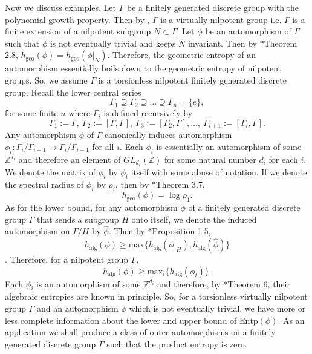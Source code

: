 \documentclass[a4paper,11pt,reqno]{amsart}
\theoremstyle{plain}
\theoremstyle{mainthmstyle}
\theoremstyle{named}
\numberwithin{equation}{section}
\begin{document}
     Now we discuss examples. Let $\Gamma$ be a finitely generated discrete group with the polynomial growth property. Then by \cite{Gromov}, $\Gamma$ is a virtually nilpotent group i.e. $\Gamma$ is a finite extension of a nilpotent subgroup $N\subset\Gamma$. Let $\phi$ be an automorphism of $\Gamma$ such that $\phi$ is not eventually trivial and keeps $N$ invariant. Then by \cite{MR4168745}*{Theorem 2.8}, $h_{\mathrm{geo}}(\phi)=h_{\mathrm{geo}}(\phi\vert_{N})$. Therefore, the geometric entropy of an automorphism essentially boils down to the geometric entropy of nilpotent groups. So, we assume $\Gamma$ is a torsionless nilpotent finitely generated discrete group. Recall the lower central series 
     \begin{displaymath}
         \Gamma_{1}\supseteq\Gamma_{2}\supseteq\ldots\supseteq\Gamma_{n}=\{e\},
     \end{displaymath}
    for some finite $n$ where $\Gamma_{i}$ is defined recursively by
    \begin{displaymath}
          \Gamma_{1}:=\Gamma, \ \Gamma_{2}:=[\Gamma,\Gamma], \ \Gamma_{3}:=[\Gamma_{2},\Gamma],\ldots, \ \Gamma_{i+1}:=[\Gamma_{i},\Gamma]. 
    \end{displaymath}
    Any automorphism $\phi$ of $\Gamma$ canonically induces automorphism $\phi_{i}:\Gamma_{i}/\Gamma_{i+1}\rightarrow\Gamma_{i}/\Gamma_{i+1}$ for all $i$. Each $\phi_{i}$ is essentially an automorphism of some $\mathbb{Z}^{d_{i}}$ and therefore an element of $GL_{d_{i}}(\mathbb{Z})$ for some natural number $d_{i}$ for each $i$. We denote the matrix of $\phi_{i}$ by $\phi_{i}$ itself with some abuse of notation. If we denote the spectral radius of $\phi_{i}$ by $\rho_{i}$, then by \cite{MR4168745}*{Theorem 3.7},
    \begin{equation} \label{abelianization}
        h_{\mathrm{geo}}(\phi)=\log\rho_1.
    \end{equation}
   As for the lower bound, for any automorphism $\phi$ of a finitely generated discrete group $\Gamma$ that sends a subgroup $H$ onto itself, we denote the induced automorphism on $\Gamma/H$ by $\hat {\phi}$. Then by \cite{MR0385834}*{Proposition 1.5}, 
\begin{equation} \label{algentlow} h_{\mathrm{alg}}(\phi)\geq\mathrm{max}\{h_{\mathrm{alg}}(\phi\vert_{H}),h_{\mathrm{alg}}(\hat {\phi})\} \end{equation}.
\hspace{-4.5mm} Therefore, for a nilpotent group $\Gamma$, \begin{displaymath}h_{\mathrm{alg}}(\phi)\geq\mathrm{max}_{i}\{h_{\mathrm{alg}}(\phi_{i})\}.\end{displaymath} Each $\phi_{i}$ is an automorphism of some $\mathbb{Z}^{d_{i}}$ and therefore, by \cite{MR540634}*{Theorem 6}, their algebraic entropies are known in principle. So, for a torsionless virtually nilpotent group $\Gamma$ and an automorphism $\phi$ which is not eventually trivial, we have more or less complete information about the lower and upper bound of $\mathrm{Entp}(\phi)$. As an application we shall produce a class of outer automorphisms on a finitely generated discrete group $\Gamma$ such that the product entropy is zero. \\ 
\end{document}
